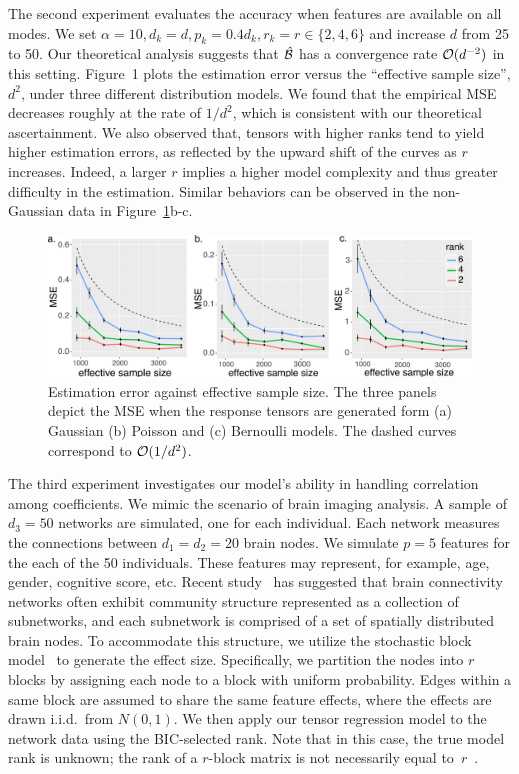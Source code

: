 \documentclass[12pt]{article}
\theoremstyle{plain}
\theoremstyle{definition}
\begin{document}
The second experiment evaluates the accuracy when features are available on all modes. We set $\alpha=10, d_k=d, p_k=0.4d_k, r_k=r\in\{2,4,6\}$ and increase $d$ from 25 to 50. Our theoretical analysis suggests that $\hat {\mathcal{B}}$ has a convergence rate $\mathcal{O}(d^{-2})$ in this setting. Figure~1 plots the estimation error versus the ``effective sample size'', $d^2$, under three different distribution models. We found that the empirical MSE decreases roughly at the rate of $1/d^2$, which is consistent with our theoretical ascertainment. We also observed that, tensors with higher ranks tend to yield higher estimation errors, as reflected by the upward shift of the curves as $r$ increases. Indeed, a larger $r$ implies a higher model complexity and thus greater difficulty in the estimation. Similar behaviors can be observed in the non-Gaussian data in Figure~\ref{fig:dim}b-c. 

\begin{figure}[t]
\centering
\includegraphics[width=15cm]{dimension.pdf}
\caption{Estimation error against effective sample size. The three panels depict the MSE when the response tensors are generated form (a) Gaussian (b) Poisson and (c) Bernoulli models. The dashed curves correspond to $\mathcal{O}({1/d^2})$.}\label{fig:dim}
\end{figure}

The third experiment investigates our model's ability in handling correlation among coefficients. We mimic the scenario of brain imaging analysis. A sample of $d_3=50$ networks are simulated, one for each individual. Each network measures the connections between $d_1=d_2=20$ brain nodes. We simulate $p=5$ features for the each of the 50 individuals. These features may represent, for example, age, gender, cognitive score, etc. Recent study~\citep{robinson2015dynamic} has suggested that brain connectivity networks often exhibit community structure represented as a collection of subnetworks, and each subnetwork is comprised of a set of spatially distributed brain nodes. To accommodate this structure, we utilize the stochastic block model~\citep{abbe2017community} to generate the effect size. Specifically, we partition the nodes into $r$ blocks by assigning each node to a block with uniform probability. Edges within a same block are assumed to share the same feature effects, where the effects are drawn i.i.d.\ from $N(0,1)$. We then apply our tensor regression model to the network data using the BIC-selected rank. Note that in this case, the true model rank is unknown; the rank of a $r$-block matrix is not necessarily equal to~$r$~\citep{zeng2019multiway}. 
\end{document}
